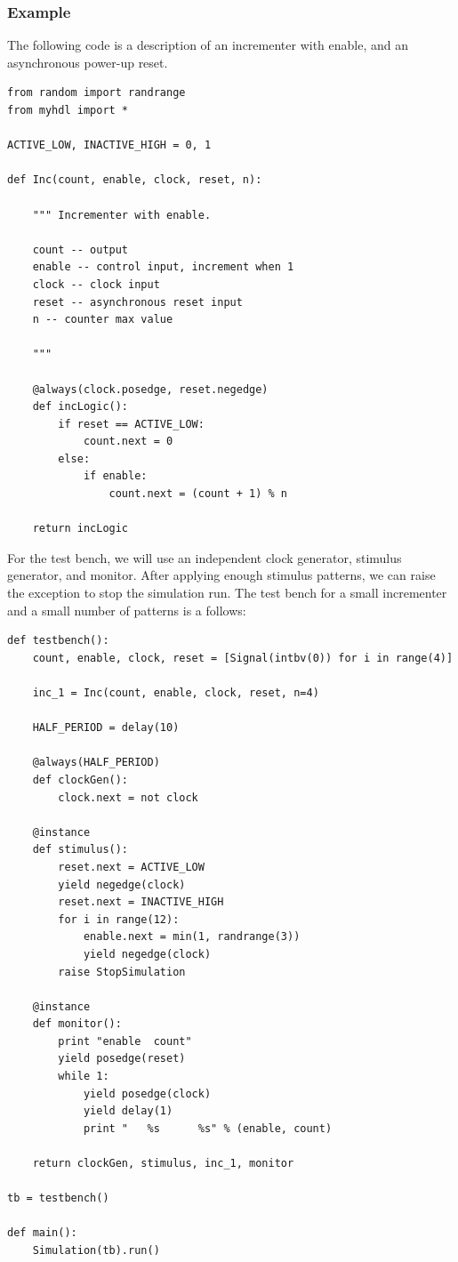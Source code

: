 \subsubsection{Example \label{model-seq-ex}}
The following code is a description of an incrementer with enable, and
an asynchronous power-up reset.

\begin{verbatim}
from random import randrange
from myhdl import *

ACTIVE_LOW, INACTIVE_HIGH = 0, 1

def Inc(count, enable, clock, reset, n):

    """ Incrementer with enable.
    
    count -- output
    enable -- control input, increment when 1
    clock -- clock input
    reset -- asynchronous reset input
    n -- counter max value

    """

    @always(clock.posedge, reset.negedge)
    def incLogic():
        if reset == ACTIVE_LOW:
            count.next = 0
        else:
            if enable:
                count.next = (count + 1) % n

    return incLogic
\end{verbatim}

For the test bench, we will use an independent clock generator, stimulus
generator, and monitor. After applying enough stimulus patterns, we
can raise the  exception to stop the
simulation run. The test bench for a small incrementer and a small
number of patterns is a follows:

\begin{verbatim}
def testbench():
    count, enable, clock, reset = [Signal(intbv(0)) for i in range(4)]

    inc_1 = Inc(count, enable, clock, reset, n=4)

    HALF_PERIOD = delay(10)

    @always(HALF_PERIOD)
    def clockGen():
        clock.next = not clock

    @instance
    def stimulus():
        reset.next = ACTIVE_LOW
        yield negedge(clock)
        reset.next = INACTIVE_HIGH
        for i in range(12):
            enable.next = min(1, randrange(3))
            yield negedge(clock)
        raise StopSimulation

    @instance
    def monitor():
        print "enable  count"
        yield posedge(reset)
        while 1:
            yield posedge(clock)
            yield delay(1)
            print "   %s      %s" % (enable, count)

    return clockGen, stimulus, inc_1, monitor

tb = testbench()

def main():
    Simulation(tb).run()
\end{verbatim}

